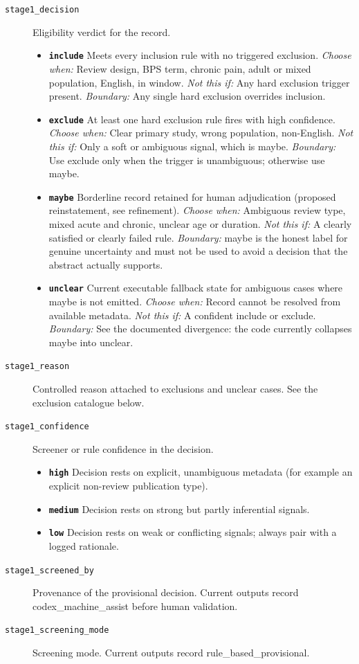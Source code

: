 \documentclass[11pt]{article}
\begin{document}
\begin{description}
\item[\texttt{stage1\_decision}] Eligibility verdict for the record.
  \begin{itemize}[leftmargin=1.3em,itemsep=2pt,topsep=2pt]
  \item \textbf{\texttt{include}} Meets every inclusion rule with no triggered exclusion. {\small \textit{Choose when:} Review design, BPS term, chronic pain, adult or mixed population, English, in window. \textit{Not this if:} Any hard exclusion trigger present. \textit{Boundary:} Any single hard exclusion overrides inclusion.}
  \item \textbf{\texttt{exclude}} At least one hard exclusion rule fires with high confidence. {\small \textit{Choose when:} Clear primary study, wrong population, non-English. \textit{Not this if:} Only a soft or ambiguous signal, which is maybe. \textit{Boundary:} Use exclude only when the trigger is unambiguous; otherwise use maybe.}
  \item \textbf{\texttt{maybe}} Borderline record retained for human adjudication (proposed reinstatement, see refinement). {\small \textit{Choose when:} Ambiguous review type, mixed acute and chronic, unclear age or duration. \textit{Not this if:} A clearly satisfied or clearly failed rule. \textit{Boundary:} maybe is the honest label for genuine uncertainty and must not be used to avoid a decision that the abstract actually supports.}
  \item \textbf{\texttt{unclear}} Current executable fallback state for ambiguous cases where maybe is not emitted. {\small \textit{Choose when:} Record cannot be resolved from available metadata. \textit{Not this if:} A confident include or exclude. \textit{Boundary:} See the documented divergence: the code currently collapses maybe into unclear.}
  \end{itemize}
\item[\texttt{stage1\_reason}] Controlled reason attached to exclusions and unclear cases. See the exclusion catalogue below.
\item[\texttt{stage1\_confidence}] Screener or rule confidence in the decision.
  \begin{itemize}[leftmargin=1.3em,itemsep=2pt,topsep=2pt]
  \item \textbf{\texttt{high}} Decision rests on explicit, unambiguous metadata (for example an explicit non-review publication type).
  \item \textbf{\texttt{medium}} Decision rests on strong but partly inferential signals.
  \item \textbf{\texttt{low}} Decision rests on weak or conflicting signals; always pair with a logged rationale.
  \end{itemize}
\item[\texttt{stage1\_screened\_by}] Provenance of the provisional decision. Current outputs record codex\_machine\_assist before human validation.
\item[\texttt{stage1\_screening\_mode}] Screening mode. Current outputs record rule\_based\_provisional.
\end{description}
\end{document}
